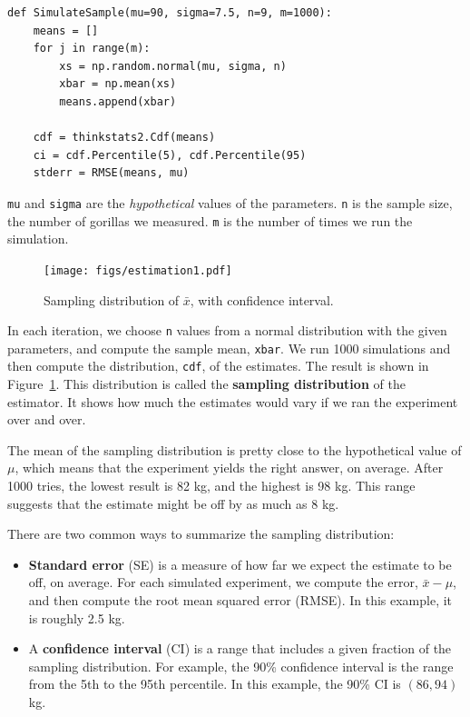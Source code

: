 \documentclass[12pt]{book}
\newcommand{\xbar}{\bar{x}}
\theoremstyle{exercise}
\begin{document}
\begin{verbatim}
def SimulateSample(mu=90, sigma=7.5, n=9, m=1000):
    means = []
    for j in range(m):
        xs = np.random.normal(mu, sigma, n)
        xbar = np.mean(xs)
        means.append(xbar)

    cdf = thinkstats2.Cdf(means)
    ci = cdf.Percentile(5), cdf.Percentile(95)
    stderr = RMSE(means, mu)
\end{verbatim}

{\tt mu} and {\tt sigma} are the {\em hypothetical\/} values of
the parameters.  {\tt n} is the sample size, the number of
gorillas we measured.  {\tt m} is the number of times we run
the simulation.%
%
%

\begin{figure}
\centerline{\texttt{[image: figs/estimation1.pdf]}}
\caption{Sampling distribution of $\xbar$, with confidence interval.}%
\label{estimation1}
\end{figure}

In each iteration, we choose {\tt n} values from a normal
distribution with the given parameters, and compute the sample mean,
{\tt xbar}.  We run 1000 simulations and then compute the
distribution, {\tt cdf}, of the estimates.  The result is shown in
Figure~\ref{estimation1}.  This distribution is called the {\bf
  sampling distribution} of the estimator.  It shows how much the
estimates would vary if we ran the experiment over and over.%

The mean of the sampling distribution is pretty close
to the hypothetical value of $\mu$, which means that the experiment
yields the right answer, on average.  After 1000 tries, the lowest
result is 82 kg, and the highest is 98 kg.  This range suggests that
the estimate might be off by as much as 8 kg.

There are two common ways to summarize the sampling distribution:

\begin{itemize}

\item {\bf Standard error} (SE) is a measure of how far we expect the
  estimate to be off, on average.  For each simulated experiment, we
  compute the error, $\xbar - \mu$, and then compute the root mean
  squared error (RMSE).  In this example, it is roughly 2.5 kg.%

\item A {\bf confidence interval} (CI) is a range that includes a
  given fraction of the sampling distribution.  For example, the 90\%
  confidence interval is the range from the 5th to the 95th
  percentile.  In this example, the 90\% CI is $(86, 94)$ kg.%
%

\end{itemize}
\end{document}
